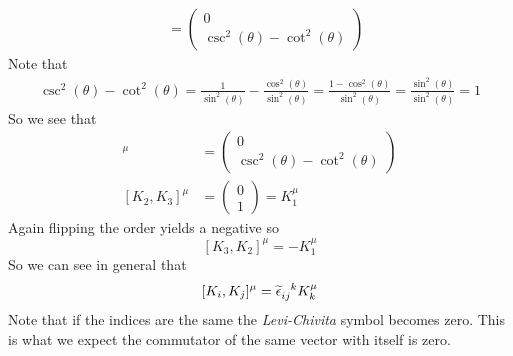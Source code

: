 \documentclass[11pt]{article}
\numberwithin{equation}{section}
\begin{document}
\begin{enumerate}[(a)]
\begin{align*}
&= \left(\begin{array}{c}
		0\\
	\csc^2(\theta) - \cot^2(\theta)
				\end{array}\right)
\end{align*}
Note that
\begin{align*}
\csc^2(\theta) - \cot^2(\theta) = \frac{1}{\sin^2(\theta)} - \frac{\cos^2(\theta)}{\sin^2(\theta)} = \frac{1-\cos^2(\theta)}{\sin^2(\theta)} = \frac{\sin^2(\theta)}{\sin^2(\theta)} = 1
\end{align*}
So we see that 
\begin{align*}
[K_2,K_3]^{\mu} &= \left(\begin{array}{c}
		0\\
	\csc^2(\theta) - \cot^2(\theta)
				\end{array}\right)\\
[K_2,K_3]^{\mu} &= \left(\begin{array}{c}
		0\\  	1
		\end{array}\right) = K^{\mu}_{1}
\end{align*}
Again flipping the order yields a negative so
$$[K_3,K_2]^{\mu} = -K^{\mu}_1$$
So we can see in general that
$$[K_i,K_j]^{\mu} = \levi_{ij}^{\ \ k}K^{\mu}_k$$
Note that if the indices are the same the \emph{Levi-Chivita} symbol becomes zero. This is what we expect the commutator of the same vector with itself is zero.
\end{enumerate}
\end{document}
